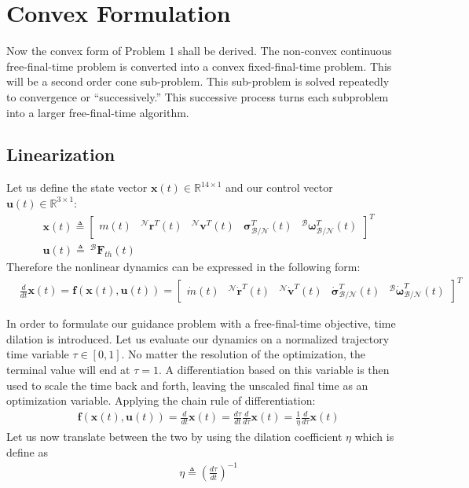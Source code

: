 \chapter{Convex Formulation}
\label{convex}

Now the convex form of Problem 1 shall be derived. The non-convex continuous free-final-time problem is converted into a convex fixed-final-time problem. This will be a second order cone sub-problem. This sub-problem is solved repeatedly to convergence or ``successively.'' This successive process turns each subproblem into a larger free-final-time algorithm.

\section{Linearization}
Let us define the state vector $\mathbf{x}(t) \in \mathbb{R}^{14\times 1}$ and our control vector $\mathbf{u}(t) \in \mathbb{R}^{3\times 1}$:
\begin{align}
& \mathbf{x}(t) \triangleq 
	\begin{bmatrix}
	m(t) & ^\mathcal{N}\mathbf{r}^T(t) & ^\mathcal{N}\mathbf{v}^T(t) & \boldsymbol{\sigma}_\mathcal{B/N}^T(t) & ^\mathcal{B}\bm{\omega}_\mathcal{B/N}^T(t)   
	\end{bmatrix}^T \\
& \mathbf{u}(t) \triangleq \ ^\mathcal{B}\mathbf{F}_{th}(t)  
\end{align}
Therefore the nonlinear dynamics can be expressed in the following form:
\begin{align}
& \frac{d}{dt}\mathbf{x}(t) = \mathbf{f}(\mathbf{x}(t), \mathbf{u}(t)) =  
	\begin{bmatrix}
	\dot{m}(t) & ^\mathcal{N}\dot{\mathbf{r}}^T(t) & ^\mathcal{N}\dot{\mathbf{v}}^T(t) & \dot{\boldsymbol{\sigma}}_\mathcal{B/N}^T(t) & ^\mathcal{B}\dot{\bm{\omega}}_\mathcal{B/N}^T(t)  
	\end{bmatrix}^T
\end{align}

In order to formulate our guidance problem with a free-final-time objective, time dilation is introduced. Let us evaluate our dynamics on a normalized trajectory time variable $\tau \in [0,1]$. No matter the resolution of the optimization, the terminal value will end at $\tau = 1$. A differentiation based on this variable is then used to scale the time back and forth, leaving the unscaled final time as an optimization variable. Applying the chain rule of differentiation: 
\begin{align}
& \mathbf{f}(\mathbf{x}(t) , \mathbf{u}(t)) =  \frac{d}{dt}\mathbf{x}(t) = \frac{d\tau}{dt} \frac{d}{d\tau}\mathbf{x}(t) =  \frac{1}{\eta}\frac{d}{d\tau}\mathbf{x}(t)
\end{align}
Let us now translate between the two by using the dilation coefficient $\eta$ which is define as
\begin{align}
& \eta \triangleq \left(\frac{d\tau}{dt}\right)^{-1}
\end{align}

